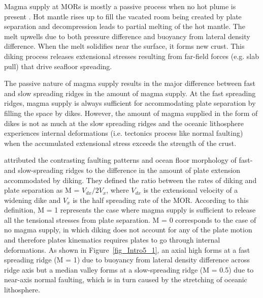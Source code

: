 Magma supply at MORs is mostly a passive process when no hot plume is present \citep{Fowler2004}. Hot mantle rises up to fill the vacated room being created by plate separation and decompression leads to partial melting of the hot mantle. The melt upwells due to both pressure difference and buoyancy from lateral density difference. When the melt solidifies near the surface, it forms new crust. This diking process releases extensional stresses resulting from far-field forces (e.g. slab pull) that drive seafloor spreading.

The passive nature of magma supply results in the major difference between fast and slow spreading ridges in the amount of magma supply. At the fast spreading ridges, magma supply is always sufficient for accommodating plate separation by filling the space by dikes. However, the amount of magma supplied in the form of dikes is not as much at the slow spreading ridges and the oceanic lithosphere experiences internal deformations (i.e. tectonics process like normal faulting) when the accumulated extensional stress exceeds the strength of the crust. 

\citet{Buck2005} attributed the contrasting faulting patterns and ocean floor morphology of fast- and slow-spreading ridges to the difference in the amount of plate extension accommodated by diking. They defined the ratio between the rates of diking and plate separation as M = $V_{dx}/2V_{x}$, where $V_{dx}$ is the extensional velocity of a widening dike and $V_{x}$ is the half spreading rate of the MOR. According to this definition, M = 1 represents the case where magma supply is sufficient to release all the tensional stresses from plate separation. M = 0 corresponds to the case of no magma supply, in which diking does not account for any of the plate motion and therefore plates kinematics requires plates to go through internal deformations. As shown in Figure~\ref{fig_Intro5_1}, an axial high forms at a fast spreading ridge (M = 1) due to buoyancy from lateral density difference across ridge axis but a median valley forms at a slow-spreading ridge (M = 0.5) due to near-axis normal faulting, which is in turn caused by the stretching of oceanic lithosphere.


